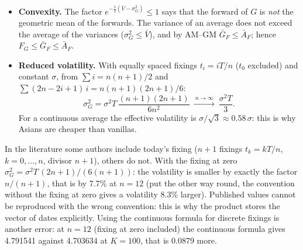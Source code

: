 \begin{idea}[title={Two facts to remember}]
\begin{itemize}
\item \textbf{Convexity.} The factor $e^{-\frac12(\bar V-\sigma_G^2)}\le1$ says that the forward of $G$ is \emph{not}
the geometric mean of the forwards. The variance of an average does not exceed the average of the variances
($\sigma_G^2\le\bar V$), and by AM--GM $\bar G_F\le\bar A_F$; hence $F_G\le\bar G_F\le\bar A_F$.
\item \textbf{Reduced volatility.} With equally spaced fixings $t_i=iT/n$ ($t_0$ excluded) and constant $\sigma$, from
$\sum i=n(n+1)/2$ and $\sum(2n-2i+1)\,i=n(n+1)(2n+1)/6$:
\[
\sigma_G^2=\sigma^2T\,\frac{(n+1)(2n+1)}{6n^2}\ \xrightarrow{\ n\to\infty\ }\ \frac{\sigma^2T}{3}.
\]
For a continuous average the effective volatility is $\sigma/\sqrt3\approx0.58\,\sigma$: this is why Asians are
cheaper than vanillas.
\end{itemize}
\end{idea}

\begin{attenzione}[title={\texorpdfstring{Conventions: the fixing at $t=0$ and the continuous formula}{Conventions: the
fixing at t=0 and the continuous formula}}]
In the literature some authors include today's fixing ($n+1$ fixings $t_k=kT/n$, $k=0,\dots,n$, divisor $n+1$), others
do not. With the fixing at zero $\sigma_G^2=\sigma^2T\,(2n+1)/(6(n+1))$: the volatility is smaller by exactly the factor
$n/(n+1)$, that is by 7.7\% at $n=12$ (put the other way round, the convention without the fixing at zero gives a
volatility 8.3\% larger). Published values cannot be reproduced with the wrong convention: this is why the product
stores the vector of dates explicitly. Using the continuous formula for discrete fixings is another error: at $n=12$
(fixing at zero included) the continuous formula gives 4.791541 against 4.703634 at $K=100$, that is 0.0879 more.
\end{attenzione}

